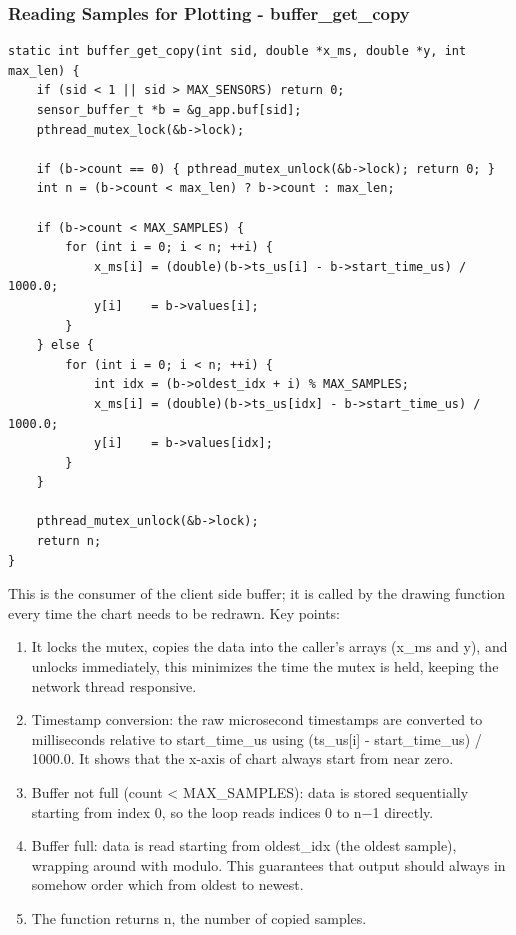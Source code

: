 \subsubsection{Reading Samples for Plotting - buffer\_get\_copy}
\begin{verbatim}
static int buffer_get_copy(int sid, double *x_ms, double *y, int max_len) {
    if (sid < 1 || sid > MAX_SENSORS) return 0;
    sensor_buffer_t *b = &g_app.buf[sid];
    pthread_mutex_lock(&b->lock);

    if (b->count == 0) { pthread_mutex_unlock(&b->lock); return 0; }
    int n = (b->count < max_len) ? b->count : max_len;

    if (b->count < MAX_SAMPLES) {
        for (int i = 0; i < n; ++i) {
            x_ms[i] = (double)(b->ts_us[i] - b->start_time_us) / 1000.0;
            y[i]    = b->values[i];
        }
    } else {
        for (int i = 0; i < n; ++i) {
            int idx = (b->oldest_idx + i) % MAX_SAMPLES;
            x_ms[i] = (double)(b->ts_us[idx] - b->start_time_us) / 1000.0;
            y[i]    = b->values[idx];
        }
    }

    pthread_mutex_unlock(&b->lock);
    return n;
}
\end{verbatim}

This is the consumer of the client side buffer; it is called by the drawing function every time the chart needs to be redrawn.
Key points:
\begin{enumerate}
\item It locks the mutex, copies the data into the caller's arrays (x\_ms and y), and unlocks immediately, this minimizes the time the mutex is held, keeping the network thread responsive.
\item Timestamp conversion: the raw microsecond timestamps are converted to milliseconds relative to start\_time\_us using (ts\_us[i] - start\_time\_us) / 1000.0. It shows that the x-axis of chart always start from near zero.
\item Buffer not full (count < MAX\_SAMPLES): data is stored sequentially starting from index 0, so the loop reads indices 0 to n−1 directly.
\item Buffer full: data is read starting from oldest\_idx (the oldest sample), wrapping around with modulo. This guarantees that output should always in somehow order which from oldest to newest.
\item The function returns n, the number of copied samples.
\end{enumerate}


